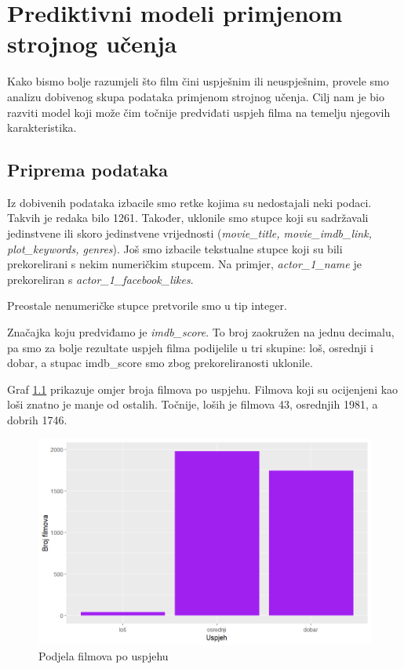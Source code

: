 

\chapter[Prediktivni modeli primjenom strojnog učenja]{Prediktivni modeli primjenom \\ strojnog učenja}

Kako bismo bolje razumjeli što film čini uspješnim ili neuspješnim, provele smo analizu dobivenog skupa podataka primjenom strojnog učenja. Cilj nam je bio razviti model koji može čim točnije predviđati uspjeh filma na temelju njegovih karakteristika.
\\
\section{Priprema podataka}
Iz dobivenih podataka izbacile smo retke kojima su nedostajali neki podaci. Takvih je redaka bilo 1261. Također, uklonile smo stupce koji su sadržavali jedinstvene ili skoro jedinstvene vrijednosti (\textit{movie\_title, movie\_imdb\_link, plot\_keywords, genres}). Još smo izbacile tekstualne stupce koji su bili prekorelirani s nekim numeričkim stupcem. Na primjer, \textit{actor\_1\_name} je prekoreliran s \textit{actor\_1\_facebook\_likes}. 

 
Preostale nenumeričke stupce pretvorile smo u tip integer. 



Značajka koju predviđamo je \textit{imdb\_score}. To broj zaokružen na jednu decimalu, pa smo za bolje rezultate uspjeh filma podijelile u tri skupine: loš, osrednji i dobar, a stupac imdb\_score smo zbog prekoreliranosti uklonile. 



Graf \ref{fig:ml1} prikazuje omjer broja filmova po uspjehu. Filmova koji su ocijenjeni kao loši znatno je manje od ostalih. Točnije, loših je filmova 43, osrednjih 1981, a dobrih 1746.

\begin{figure}[H]
	\centering
	\includegraphics[width=15cm]{../figures/expl/001.png}
	\caption{Podjela filmova po uspjehu}
	\label{fig:ml1}
\end{figure}

